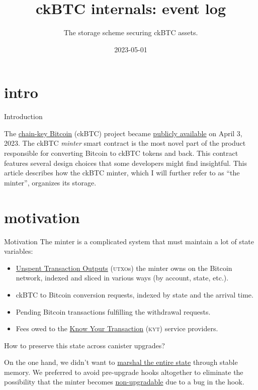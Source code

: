 \documentclass{article}
\title{ckBTC internals: event log}
\subtitle{The storage scheme securing ckBTC assets.}
\date{2023-05-01}
\begin{document}
\section{intro}{Introduction}
  
The \href{https://medium.com/dfinity/chain-key-bitcoin-a-decentralized-bitcoin-twin-ceb8f4ddf95e}{chain-key Bitcoin} (ckBTC) project became \href{https://twitter.com/dfinity/status/1642887821731004418}{publicly available} on April 3, 2023.
The ckBTC \emph{minter} smart contract is the most novel part of the product responsible for converting Bitcoin to ckBTC tokens and back.
This contract features several design choices that some developers might find insightful.
This article describes how the ckBTC minter, which I will further refer to as ``the minter'', organizes its storage.

\section{motivation}{Motivation}
The minter is a complicated system that must maintain a lot of state variables:

\begin{itemize}
    \item
    \href{https://en.wikipedia.org/wiki/Unspent_transaction_output}{Unspent Transaction Outputs} (\textsc{utxo}s) the minter owns on the Bitcoin network, indexed and sliced in various ways (by account, state, etc.).
    \item
    ckBTC to Bitcoin conversion requests, indexed by state and the arrival time.
    \item
    Pending Bitcoin transactions fulfilling the withdrawal requests.
    \item
    Fees owed to the \href{https://thepaypers.com/expert-opinion/know-your-transaction-kyt-the-key-to-combating-transaction-laundering--1246231}{Know Your Transaction} (\textsc{kyt}) service providers.
\end{itemize}

How to preserve this state across canister upgrades?

On the one hand, we didn't want to \href{/posts/11-ii-stable-memory.html#conventional-memory-management}{marshal the entire state} through stable memory.
We preferred to avoid pre-upgrade hooks altogether to eliminate the possibility that the minter becomes \href{/posts/01-effective-rust-canisters.html#upgrade-hook-panics}{non-upgradable} due to a bug in the hook.
\end{document}
